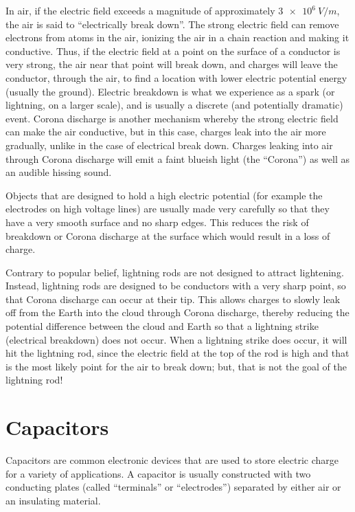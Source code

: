 In air, if the electric field exceeds a magnitude of approximately $\SI{3e6}{V/m}$, the air is said to ``electrically break down''. The strong electric field can remove electrons from atoms in the air, ionizing the air in a chain reaction and making it conductive. Thus, if the electric field at a point on the surface of a conductor is very strong, the air near that point will break down, and charges will leave the conductor, through the air, to find a location with lower electric potential energy (usually the ground). Electric breakdown is what we experience as a spark (or lightning, on a larger scale), and is usually a discrete (and potentially dramatic) event. Corona discharge is another mechanism whereby the strong electric field can make the air conductive, but in this case, charges leak into the air more gradually, unlike in the case of electrical break down. Charges leaking into air through Corona discharge will emit a faint blueish light (the ``Corona'') as well as an audible hissing sound.

Objects that are designed to hold a high electric potential (for example the electrodes on high voltage lines) are usually made very carefully so that they have a very smooth surface and no sharp edges. This reduces the risk of breakdown or Corona discharge at the surface which would result in a loss of charge.

Contrary to popular belief, lightning rods are not designed to attract lightening. Instead, lightning rods are designed to be conductors with a very sharp point, so that Corona discharge can occur at their tip. This allows charges to slowly leak off from the Earth into the cloud through Corona discharge, thereby reducing the potential difference between the cloud and Earth so that a lightning strike (electrical breakdown) does not occur. When a lightning strike does occur, it will hit the lightning rod, since the electric field at the top of the rod is high and that is the most likely point for the air to break down; but, that is not the goal of the lightning rod!
\newpage
\section{Capacitors}
\label{sec:potential:capacitors}
Capacitors are common electronic devices that are used to store electric charge for a variety of applications. A capacitor is usually constructed with two conducting plates (called ``terminals'' or ``electrodes'') separated by either air or an insulating material.

